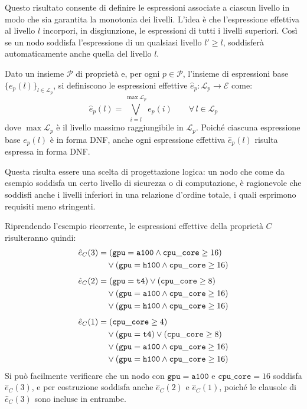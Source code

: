 Questo risultato consente di definire le espressioni associate a ciascun livello in modo che sia garantita la monotonia dei livelli. L'idea è che l'espressione effettiva al livello $l$ incorpori, in disgiunzione, le espressioni di tutti i livelli superiori. Così se un nodo soddisfa l'espressione di un qualsiasi livello $l' \geq l$, soddisferà automaticamente anche quella del livello $l$.

\begin{definition}
    \label{def:espressioni_effettive}
    Dato un insieme $\mathcal{P}$ di proprietà e, per ogni $p \in \mathcal{P}$, l'insieme di espressioni base $\{e_p(l)\}_{l \in \mathcal{L}_p}$, si definiscono le espressioni effettive $\hat{e}_p : \mathcal{L}_p \rightarrow \mathcal{E}$ come:
    \begin{equation}
        \hat{e}_p(l) = \bigvee_{i = l}^{\max \mathcal{L}_p} e_p(i) 
        \qquad 
        \forall\, l \in \mathcal{L}_p
    \end{equation}
    dove $\max \mathcal{L}_p$ è il livello massimo raggiungibile in $\mathcal{L}_p$. Poiché ciascuna espressione base $e_p(l)$ è in forma DNF, anche ogni espressione effettiva $\hat{e}_p(l)$ risulta espressa in forma DNF.
\end{definition}

Questa risulta essere una scelta di progettazione logica: un nodo che come da esempio soddisfa un certo livello di sicurezza o di computazione, è ragionevole che soddisfi anche i livelli inferiori in una relazione d'ordine totale, i quali esprimono requisiti meno stringenti.

Riprendendo l'esempio ricorrente, le espressioni effettive della proprietà $C$ 
risulteranno quindi:
\begin{align}
    \hat{e}_C(3) &= (\mathtt{gpu=a100} \land \mathtt{cpu\_core} \geq 16) \\
                 \notag &\quad \lor (\mathtt{gpu=h100} \land \mathtt{cpu\_core} \geq 16) \\[1ex]
    \hat{e}_C(2) &= (\mathtt{gpu=t4}) \lor (\mathtt{cpu\_core} \geq 8) \\
                 \notag &\quad \lor (\mathtt{gpu=a100} \land \mathtt{cpu\_core} \geq 16) \\
                 \notag &\quad \lor (\mathtt{gpu=h100} \land \mathtt{cpu\_core} \geq 16) \\[1ex]
    \hat{e}_C(1) &= (\mathtt{cpu\_core} \geq 4) \\
                 \notag &\quad \lor (\mathtt{gpu=t4}) \lor (\mathtt{cpu\_core} \geq 8) \\
                 \notag &\quad \lor (\mathtt{gpu=a100} \land \mathtt{cpu\_core} \geq 16) \\
                 \notag &\quad \lor (\mathtt{gpu=h100} \land \mathtt{cpu\_core} \geq 16)
\end{align}
Si può facilmente verificare che un nodo con $\mathtt{gpu=a100}$ e $\mathtt{cpu\_core} = 16$ soddisfa $\hat{e}_C(3)$, e per costruzione soddisfa anche $\hat{e}_C(2)$ e $\hat{e}_C(1)$, poiché le clausole di $\hat{e}_C(3)$ sono incluse in entrambe.

